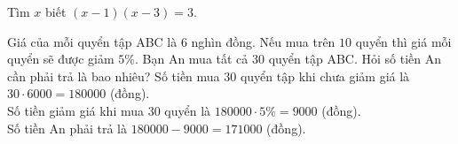 \begin{bt}%
	Tìm $x$ biết $(x-1)(x-3)=3$.
	\loigiai{
	$(x-1)(x-3)=3\Leftrightarrow x^2-4x=0\Leftrightarrow x(x-4)=0\Leftrightarrow
	\left[\begin{array}{l}
    x=0\\x=4.
\end{array}\right.$}
\end{bt}
\begin{bt}%
	Giá của mỗi quyển tập ABC là $6$ nghìn đồng. Nếu mua trên $10$ quyển thì giá mỗi quyển sẽ được giảm $5\%$. Bạn An mua tất cả $30$ quyển tập ABC. Hỏi số tiền An cần phải trả là bao nhiêu?
	\loigiai
	{Số tiền mua $30$ quyển tập khi chưa giảm giá là $30\cdot 6000=180000$ (đồng).\\
	Số tiền giảm giá khi mua $30$ quyển là $180000\cdot 5\% =9000$ (đồng).\\
	Số tiền An phải trả là $180000 - 9000 = 171000$ (đồng).
	}
\end{bt}
